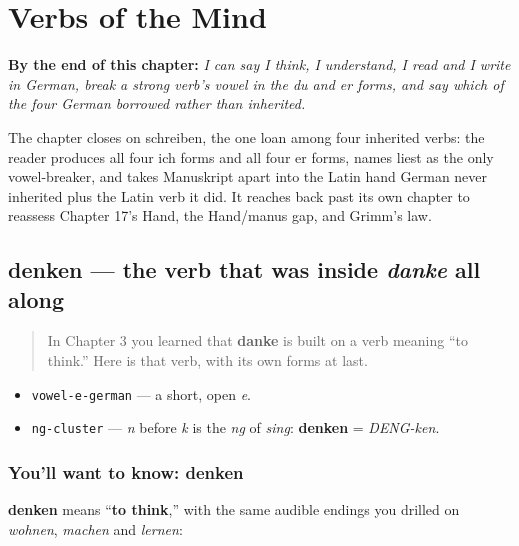 
\chapter{Verbs of the Mind}
\label{ch:ge-mind-verbs}

\begin{chapteropening}
\textbf{By the end of this chapter:} \emph{I can say I think, I understand, I read and I write in German, break a strong verb's vowel in the du and er forms, and say which of the four German borrowed rather than inherited.}

The chapter closes on schreiben, the one loan among four inherited verbs: the reader produces all four ich forms and all four er forms, names liest as the only vowel-breaker, and takes Manuskript apart into the Latin hand German never inherited plus the Latin verb it did. It reaches back past its own chapter to reassess Chapter 17's Hand, the Hand/manus gap, and Grimm's law.
\end{chapteropening}

\section[denken]{denken — the verb that was inside \emph{danke} all along}

\label{lesson:GE-C24-denken}



\begin{quote}
In Chapter 3 you learned that \textbf{danke} is built on a verb meaning \textquotedblleft{}to think.\textquotedblright{} Here is that verb, with its own forms at last.
\end{quote}

\begin{sounds}
\begin{itemize}
\raggedright
  \item \texttt{vowel-e-german} — a short, open \emph{e}.
  \item \texttt{ng-cluster} — \emph{n} before \emph{k} is the \emph{ng} of \emph{sing}: \textbf{denken} = \emph{DENG-ken}.
\end{itemize}
\end{sounds}

\subsection*{You'll want to know: denken}
\textbf{denken} means \textquotedblleft{}\textbf{to think},\textquotedblright{} with the same audible endings you drilled on \emph{wohnen}, \emph{machen} and \emph{lernen}:

